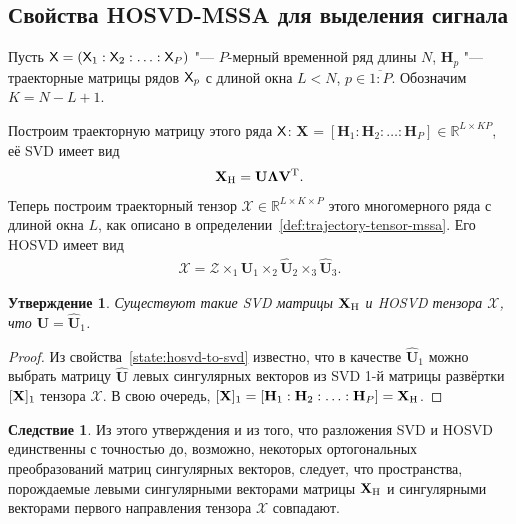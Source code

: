 \documentclass[specialist,
    substylefile = spbu.rtx,
    subf,href,colorlinks=true, 12pt]{disser}
\theoremstyle{plain}
\newtheorem{statement}{Утверждение}[section]
\theoremstyle{definition}
\newtheorem*{corollary}{Следствие}
\theoremstyle{remark}
\begin{document}
    \subsection{Свойства HOSVD-MSSA для выделения сигнала}\label{subsec:hosvd-mssa-signal-properties}
    Пусть $\mathsf{X} = \left(\mathsf{X}_1: \mathsf{X}_2:\ldots: \mathsf{X}_P\right)$ "--- $P$-мерный временной ряд длины $N$,
    $\mathbf{H}_p$ "--- траекторные матрицы рядов $\mathsf{X}_p$ с длиной окна $L < N$, $p\in \overline{1:P}$.
    Обозначим $K = N - L + 1$.

    Построим траекторную матрицу этого ряда $\mathsf{X}$:
    $\mathbf{X}_{} = [\mathbf{H}_1: \mathbf{H}_2: \ldots: \mathbf{H}_P] \in \mathbb{R}^{L\times KP}$,
    её SVD имеет вид
    \begin{gather*}
        \mathbf{X}_{\mathrm{H}} =\mathbf{U} \mathbf{\Lambda} \mathbf{V}^{\mathrm{T}}.
    \end{gather*}
    Теперь построим траекторный тензор $\mathcal{X}\in \mathbb{R}^{L\times K \times P}$ этого многомерного ряда
    с длиной окна $L$, как описано в определении~\ref{def:trajectory-tensor-mssa}.
    Его HOSVD имеет вид
    \begin{gather}
        \mathcal{X}=\mathcal{Z} \times_1 \widehat{\mathbf{U}}_1 \times_2 \widehat{\mathbf{U}}_2
        \times_3 \widehat{\mathbf{U}}_3.
        \label{eq:subspace-tens-hosvd}
    \end{gather}

    \begin{statement}
        Существуют такие \emph{SVD} матрицы $\mathbf{X}_{\mathrm{H}}$ и \emph{HOSVD} тензора $\mathcal{X}$, что
        $\mathbf{U} = \widehat{\mathbf{U}}_1$.\label{state:tens-mssa-rank}
    \end{statement}

    \begin{proof}
        Из свойства~\ref{state:hosvd-to-svd} известно, что в качестве $\widehat{\mathbf{U}}_1$ можно выбрать матрицу
        $\widehat{\mathbf{U}}$ левых сингулярных векторов из SVD 1-й матрицы развёртки $[\mathbf{X}]_{1}$
        тензора $\mathcal{X}$.
        В свою очередь, $[\mathbf{X}]_{1} = [\mathbf{H}_1: \mathbf{H}_2: \ldots: \mathbf{H}_P] = \mathbf{X}_{\mathrm{H}}$.
    \end{proof}

    \begin{corollary}
        Из этого утверждения и из того, что разложения SVD и HOSVD единственны с точностью
        до, возможно, некоторых ортогональных преобразований матриц сингулярных векторов,
        следует, что пространства, порождаемые левыми сингулярными векторами матрицы $\mathbf{X}_{\mathrm{H}}$
        и сингулярными векторами первого направления тензора $\mathcal{X}$ совпадают.
    \end{corollary}
\end{document}
